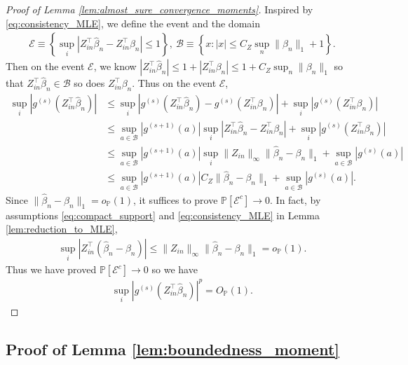 \documentclass[12pt]{article}
\theoremstyle{definition}
\def\P{\mathbb{P}}
\def\P{\mathbb{P}}
\renewcommand{\P}{\mathbb{P}}							%
\newcommand{\srz}{Z}									%
\begin{document}
\begin{proof}[Proof of Lemma \ref{lem:almost_sure_convergence_moments}]
Inspired by \eqref{eq:consistency_MLE}, we define the event and the domain
\begin{align}\label{eq:event_A_E}
  \mathcal{E}\equiv \left\{\sup_{i}|Z_{in}^\top \widehat{\beta}_n-\srz_{in}^\top\beta_n|\leq 1\right\},\ \mathcal{B}\equiv \left\{x:|x|\leq C_Z\sup_n\|\beta_n\|_1+1\right\}.
\end{align}
Then on the event $\mathcal{E}$, we know $|Z_{in}^\top\widehat{\beta}_n|\leq 1+|\srz_{in}^\top \beta_n|\leq 1+ C_Z\sup_{n}\|\beta_n\|_1$ so that $\srz_{in}^\top\widehat\beta_n\in \mathcal{B}$ so does $\srz_{in}^\top\beta_n$. Thus on the event $\mathcal{E}$,
\begin{align*}
  \sup_{i}|g^{(s)}(\srz_{in}^\top\widehat{\beta}_n)|
  &
  \leq \sup_{i}|g^{(s)}(\srz_{in}^\top\widehat{\beta}_n)-g^{(s)}(\srz_{in}^\top\beta_n)|+\sup_{i}|g^{(s)}(\srz_{in}^\top\beta_n)|\\
  &
  \leq \sup_{a\in\mathcal{B}}|g^{(s+1)}(a)|\sup_{i}|\srz_{in}^\top\widehat{\beta}_n-\srz_{in}^\top \beta_n|+\sup_{i}|g^{(s)}(\srz_{in}^\top\beta_n)|\\
  &
  \leq \sup_{a\in\mathcal{B}}|g^{(s+1)}(a)|\sup_{i}\|\srz_{in}\|_\infty\|\widehat{\beta}_n-\beta_n\|_1+\sup_{a\in\mathcal{B}}|g^{(s)}(a)|\\
  &
  \leq \sup_{a\in\mathcal{B}}|g^{(s+1)}(a)|C_Z\|\widehat{\beta}_n-\beta_n\|_1+\sup_{a\in\mathcal{B}}|g^{(s)}(a)|.
\end{align*}
Since $\|\widehat{\beta}_n-\beta_n\|_1=o_{\P}(1)$, it suffices to prove $\P[\mathcal{E}^c]\rightarrow0$. In fact, by assumptions \eqref{eq:compact_support} and \eqref{eq:consistency_MLE} in Lemma \ref{lem:reduction_to_MLE},
\begin{align*}
  \sup_i|\srz_{in}^\top (\widehat{\beta}_n-\beta_n)|\leq \|\srz_{in}\|_\infty\|\widehat{\beta}_n-\beta_n\|_1=o_\P(1).
\end{align*}
Thus we have proved $\P[\mathcal{E}^c]\rightarrow0$ so we have 
\begin{align*}
  \sup_{i}|g^{(s)}(Z_{in}^\top \widehat\beta_n)|^p=O_{\P}(1).
\end{align*}

\end{proof}


\subsection{Proof of Lemma \ref{lem:boundedness_moment}}
\end{document}
